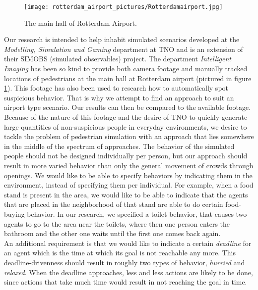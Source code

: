 \documentclass[11pt, a4paper]{book}
\begin{document}
\begin{figure}
\begin{center}
\texttt{[image: rotterdam\_airport\_pictures/Rotterdamairport.jpg]}

\end{center}
\caption{The main hall of Rotterdam Airport.}
\label{fig:airportimage}
\end{figure}

Our research is intended to help inhabit simulated scenarios developed at the \emph{Modelling, Simulation and Gaming} department at TNO and is an extension of their SIMOBS (simulated observables) project. The department \emph{Intelligent Imaging} has been so kind to provide both camera footage and manually tracked locations of pedestrians at the main hall at Rotterdam airport (pictured in figure \ref{fig:airportimage}). This footage has also been used to research how to automatically spot suspicious behavior. That is why we attempt to find an approach to suit an airport type scenario. Our results can then be compared to the available footage.\\
Because of the nature of this footage and the desire of TNO to quickly generate large quantities of non-suspicious people in everyday environments, we desire to tackle the problem of pedestrian simulation with an approach that lies somewhere in the middle of the spectrum of approaches. The behavior of the simulated people should not be designed individually per person, but our approach should result in more varied behavior than only the general movement of crowds through openings. We would like to be able to specify behaviors by indicating them in the environment, instead of specifying them per individual. For example, when a food stand is present in the area, we would like to be able to indicate that the agents that are placed in the neighborhood of that stand are able to do certain food-buying behavior. In our research, we specified a toilet behavior, that causes two agents to go to the area near the toilets, where then one person enters the bathroom and the other one waits until the first one comes back again.\\
An additional requirement is that we would like to indicate a certain \emph{deadline} for an agent which is the time at which its goal is not reachable any more. This deadline-drivenness should result in roughly two types of behavior, \emph{hurried} and \emph{relaxed}. When the deadline approaches, less and less actions are likely to be done, since actions that take much time would result in not reaching the goal in time.\\
\end{document}
